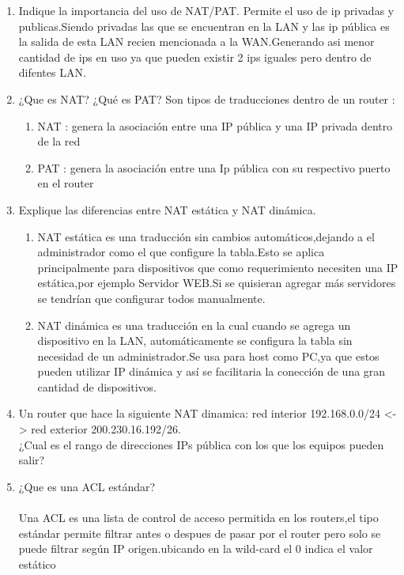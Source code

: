 \documentclass{udparticle}
\begin{document}
\begin{enumerate}
\item Indique la importancia del uso de NAT/PAT.
Permite el uso de ip privadas y publicas.Siendo privadas las que se encuentran en la LAN y las ip pública es la
salida de esta LAN recien mencionada a la WAN.Generando asi menor cantidad de ips en uso ya que pueden existir
2 ips iguales pero dentro de difentes LAN.\\
\item ¿Que es NAT? ¿Qué es PAT?
Son tipos de traducciones dentro de un router :
\begin{enumerate}
	\item NAT : genera la asociación entre una IP pública y una IP privada dentro de la red
	\item PAT : genera la asociación entre una Ip pública con su respectivo puerto en el router
\end{enumerate}
\item Explique las diferencias entre NAT estática y NAT dinámica.
\begin{enumerate}
\item NAT estática es una traducción sin cambios automáticos,dejando a el administrador como
el que configure la tabla.Esto se aplica principalmente para dispositivos que como requerimiento
necesiten una IP estática,por ejemplo Servidor WEB.Si se quisieran agregar más servidores se tendrían que 
configurar todos manualmente.\\
\item NAT dinámica es una traducción en la cual cuando se agrega un dispositivo en la LAN, automáticamente
se configura la tabla sin necesidad de un administrador.Se usa para host como PC,ya que estos pueden utilizar
IP dinámica y así se facilitaria la conección de una gran cantidad de dispositivos.\\
\end{enumerate}
\item Un router que hace la siguiente NAT dinamica: red interior 
192.168.0.0/24 <-> red exterior 200.230.16.192/26.\\
¿Cual es el rango de direcciones IPs pública con los que los equipos 
pueden salir?
\item ¿Que es una ACL estándar?\\\\
Una ACL es una lista de control de acceso permitida en los routers,el tipo estándar permite filtrar antes o despues 
de pasar por el router pero solo se puede filtrar según IP origen.ubicando en la wild-card el 0 indica el valor estático 

\end{enumerate}
\end{document}
